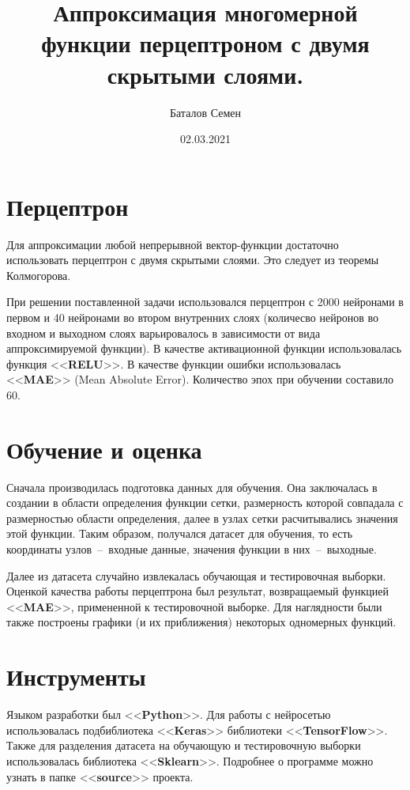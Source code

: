 \documentclass[12pt, a4paper]{article}
\title{Аппроксимация многомерной функции перцептроном с двумя скрытыми слоями.}
\author{Баталов Семен}
\date{02.03.2021}
\begin{document}
    
    \sloppy
    
    \maketitle
    
    \section{Перцептрон}
    
    Для аппроксимации любой непрерывной вектор-функции достаточно 
    использовать перцептрон с двумя скрытыми слоями. Это следует из теоремы 
    Колмогорова.
    
    При решении поставленной задачи использовался перцептрон с 2000 
    нейронами в первом и 40 нейронами во втором внутренних слоях (количесво 
    нейронов во входном и выходном слоях варьировалось в зависимости от вида 
    аппроксимируемой функции). В качестве активационной функции 
    использовалась функция <<\textbf{RELU}>>. В качестве функции ошибки 
    использовалась <<\textbf{MAE}>> (Mean Absolute Error). Количество эпох 
    при обучении составило 60.
    
    \section{Обучение и оценка}
    
    Сначала производилась подготовка данных для обучения. Она заключалась в 
    создании в области определения функции сетки, размерность которой 
    совпадала с размерностью области определения, далее в узлах сетки 
    расчитывались значения этой функции. Таким образом, получался датасет 
    для обучения, то есть координаты узлов~--~входные данные, значения 
    функции в них~--~выходные.
    
    Далее из датасета случайно извлекалась обучающая и тестировочная 
    выборки. Оценкой качества работы перцептрона был результат, возвращаемый 
    функцией <<\textbf{MAE}>>, примененной к тестировочной выборке. Для 
    наглядности были также построены графики (и их приближения) некоторых 
    одномерных функций.
    
    \section{Инструменты}
    
    Языком разработки был <<\textbf{Python}>>. Для работы с нейросетью 
    использовалась подбиблиотека <<\textbf{Keras}>> библиотеки 
    <<\textbf{TensorFlow}>>. Также для разделения датасета на обучающую и 
    тестировочную выборки использовалась библиотека <<\textbf{Sklearn}>>. 
    Подробнее о программе можно узнать в папке <<\textbf{source}>> проекта.
    
\end{document}
